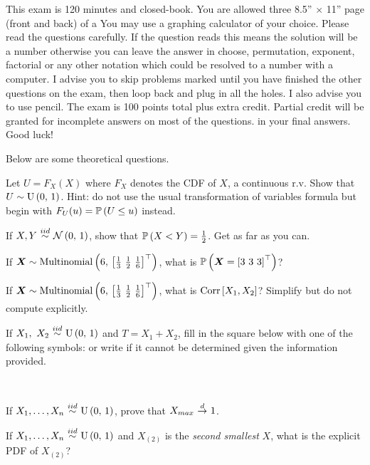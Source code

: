 \documentclass[12pt]{article}
\begin{document}
This exam is 120 minutes and closed-book. You are allowed three 8.5'' $\times$ 11'' page (front and back) of a  You may use a graphing calculator of your choice. Please read the questions carefully. If the question reads  this means the solution will be a number otherwise you can leave the answer in choose, permutation, exponent, factorial or any other notation which could be resolved to a number with a computer. I advise you to skip problems marked  until you have finished the other questions on the exam, then loop back and plug in all the holes. I also advise you to use pencil. The exam is 100 points total plus extra credit. Partial credit will be granted for incomplete answers on most of the questions.  in your final answers. Good luck!

\pagebreak

\problem Below are some theoretical questions.

\benum


 Let $U = F_X(X)$ where $F_X$ denotes the CDF of $X$, a continuous r.v. Show that $U \sim \mathrm{U}\left(0,\,1\right)$.  Hint: do not use the usual transformation of variables formula but begin with $F_U(u) = \mathbb{P}\left(U \leq u\right)$ instead.  %

 If $X, Y \iid \stdnormnot$, show that $\mathbb{P}\left(X < Y\right) = \frac{1}{2}$. Get as far as you can.  %

 If $\boldsymbol{X} \sim \mathrm{Multinomial}\left(6,\,\left[\frac{1}{3} ~ \frac{1}{2} ~ \frac{1}{6}\right]^\top\right)$, what is $\mathbb{P}\left(\boldsymbol{X} = \left[3 ~3 ~3\right]^\top\right)$?  %

 If $\boldsymbol{X} \sim \mathrm{Multinomial}\left(6,\,\left[\frac{1}{3} ~ \frac{1}{2} ~ \frac{1}{6}\right]^\top\right)$, what is $\text{Corr}\left[X_1, X_2\right]$? Simplify but do not compute explicitly.  %



 If $X_1, ~X_2 \iid \stduniform$ and $T = X_1 + X_2$, fill in the square below with one of the following symbols: \qu{$=,~\geq,~\leq,~>,~<$} or write  if it cannot be determined given the information provided.

\beqn
{} ~~ \text{\Huge{$\square$}} ~~ 
\eeqn~ %


 If $\Xoneton \iid \stduniform$, prove that $X_{max} \convd 1$. 


 If $\Xoneton \iid \stduniform$ and $X_{(2)}$ is the \emph{second smallest} $X$, what is the explicit PDF of $X_{(2)}$?  %
\end{document}
